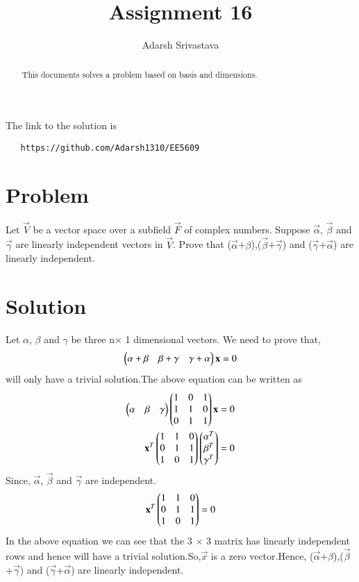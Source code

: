 \documentclass[journal,12pt,twocolumn]{IEEEtran}
\begin{document}
       \def\rightbox#1{\makebox[0in][r]{#1}}
       \def\centbox#1{\makebox[0in]{#1}}
       \def\topbox#1{\raisebox{-\baselineskip}[0in][0in]{#1}}
       \def\midbox#1{\raisebox{-0.5\baselineskip}[0in][0in]{#1}}
  \vspace{3cm}
  \title{Assignment 16}
  \author{Adarsh Srivastava}
  \maketitle
  \newpage
  \bigskip
  \renewcommand{\thetable}{\theenumi}
  The link to the solution is
  \begin{lstlisting}
   https://github.com/Adarsh1310/EE5609
  \end{lstlisting}
  \begin{abstract}
  This documents solves a problem based on basis and dimensions.
  \end{abstract}
   \section{\textbf{Problem}}
   Let $\vec{V}$ be a vector space over a subfield $\vec{F}$ of complex numbers. Suppose $\vec{\alpha}$, $\vec{\beta}$ and $\vec{\gamma}$ are linearly independent vectors in $\vec{V}$. Prove that ($\vec{\alpha}$+$\beta$),($\vec{\beta}$+$\vec{\gamma}$) and ($\vec{\gamma}$+$\vec{\alpha}$) are linearly independent.
   \section{\textbf{Solution}}
   Let $\alpha$, $\beta$ and $\gamma$ be three n$\times$ 1 dimensional vectors. We need to prove that,
   \begin{align}
   \begin{pmatrix}\alpha+\beta&\beta+\gamma&\gamma+\alpha\end{pmatrix}\mathbf{x}=0
  \end{align}
     will only have a trivial solution.The above equation can be written as
  \begin{align}
  \begin{pmatrix}\alpha&\beta&\gamma\end{pmatrix} \begin{pmatrix}1&0&1\\1&1&0\\0&1&1\end{pmatrix}\mathbf{x}=0\\
   \mathbf{x}^T\begin{pmatrix}1&1&0\\0&1&1\\1&0&1\end{pmatrix}\begin{pmatrix}\alpha^T\\\beta^T\\\gamma^T\end{pmatrix}=0\label{final}
   \end{align}
Since, $\vec{\alpha}$, $\vec{\beta}$ and $\vec{\gamma}$ are independent.
\begin{align}
 \mathbf{x}^T\begin{pmatrix}1&1&0\\0&1&1\\1&0&1\end{pmatrix}=0
\end{align} 
In the above equation we can see that the 3 $\times$ 3 matrix has linearly independent rows and hence will have a trivial solution.So,$\vec{x}$ is a zero vector.Hence, ($\vec{\alpha}$+$\beta$),($\vec{\beta}$+$\vec{\gamma}$) and ($\vec{\gamma}$+$\vec{\alpha}$) are linearly independent.
\end{document}
